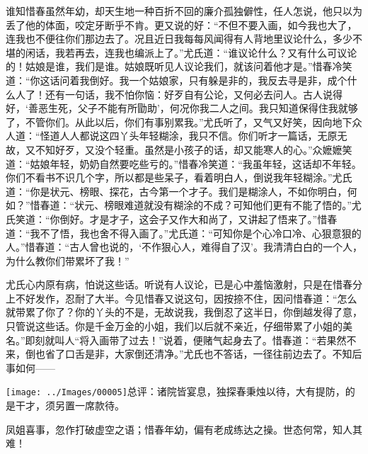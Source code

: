 谁知惜春虽然年幼，却天生地一种百折不回的廉介孤独僻性，任人怎说，他只以为丢了他的体面，咬定牙断乎不肯。更又说的好：``不但不要入画，如今我也大了，连我也不便往你们那边去了。况且近日我每每风闻得有人背地里议论什么，多少不堪的闲话，我若再去，连我也编派上了。''尤氏道：``谁议论什么？又有什么可议论的！姑娘是谁，我们是谁。姑娘既听见人议论我们，就该问着他才是。''惜春冷笑道：``你这话问着我倒好。我一个姑娘家，只有躲是非的，我反去寻是非，成个什么人了！还有一句话，我不怕你恼：好歹自有公论，又何必去问人。古人说得好，`善恶生死，父子不能有所勖助'，何况你我二人之间。我只知道保得住我就够了，不管你们。从此以后，你们有事别累我。''尤氏听了，又气又好笑，因向地下众人道：``怪道人人都说这四丫头年轻糊涂，我只不信。你们听才一篇话，无原无故，又不知好歹，又没个轻重。虽然是小孩子的话，却又能寒人的心。''众嬷嬷笑道：``姑娘年轻，奶奶自然要吃些亏的。''惜春冷笑道：``我虽年轻，这话却不年轻。你们不看书不识几个字，所以都是些呆子，看着明白人，倒说我年轻糊涂。''尤氏道：``你是状元、榜眼、探花，古今第一个才子。我们是糊涂人，不如你明白，何如？''惜春道：``状元、榜眼难道就没有糊涂的不成？可知他们更有不能了悟的。''尤氏笑道：``你倒好。才是才子，这会子又作大和尚了，又讲起了悟来了。''惜春道：``我不了悟，我也舍不得入画了。''尤氏道：``可知你是个心冷口冷、心狠意狠的人。''惜春道：``古人曾也说的，`不作狠心人，难得自了汉'。我清清白白的一个人，为什么教你们带累坏了我！''

尤氏心内原有病，怕说这些话。听说有人议论，已是心中羞恼激射，只是在惜春分上不好发作，忍耐了大半。今见惜春又说这句，因按捺不住，因问惜春道：``怎么就带累了你了？你的丫头的不是，无故说我，我倒忍了这半日，你倒越发得了意，只管说这些话。你是千金万金的小姐，我们以后就不亲近，仔细带累了小姐的美名。''即刻就叫人``将入画带了过去！''说着，便赌气起身去了。惜春道：``若果然不来，倒也省了口舌是非，大家倒还清净。''尤氏也不答话，一径往前边去了。不知后事如何------

{\texttt{[image: ../Images/00005]}\kaishu 总评：诸院皆宴息，独探春秉烛以待，大有提防，的是干才，须另置一席款待。}

{\kaishu 凤姐喜事，忽作打破虚空之语；惜春年幼，偏有老成练达之操。世态何常，知人其难！}


